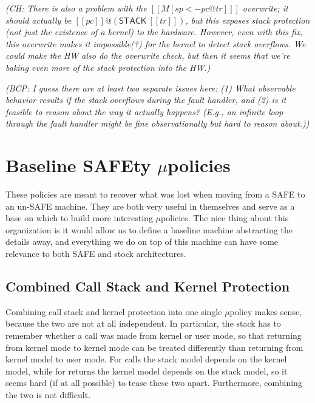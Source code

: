 \documentclass{article}
\newcommand{\bcp}[1]{{\color{blue}\em (BCP: #1)}}
\newcommand{\ch}[1]{{\color{dkblue}\em (CH: #1)}}
\newcommand{\micro}{$\mu$}
\newcommand{\uP}{\micro policy\xspace}
\newcommand{\uPs}{\micro policies\xspace}
\begin{document}
\ch{There is also a problem with the $[[M[sp <- pc@tr] ]]$ overwrite;
  it should actually be $[[pc]]@(\mathsf{STACK}~[[tr]])$, but this
  exposes stack protection (not just the existence of a kernel) to the
  hardware. However, even with this fix, this overwrite makes it
  impossible(?) for the kernel to detect stack overflows. We could
  make the HW also do the overwrite check, but then it seems that
  we're baking even more of the stack protection into the HW.}

\bcp{I guess there are at least two separate issues here: (1) What
  observable behavior results if the stack overflows during the fault
  handler, and (2) is it feasible to reason about the way it actually
  happens?  (E.g., an infinite loop through the fault handler might be fine
  observationally but hard to reason about.)}

\section{Baseline SAFEty \uPs}

These policies are meant to recover what was lost when moving from a
SAFE to an un-SAFE machine. They are both very useful in themselves
and serve as a base on which to build more interesting \uPs.
%
The nice thing about this organization is it would allow us to define
a baseline machine abstracting the details away, and everything we do
on top of this machine can have some relevance to both SAFE and stock
architectures.

\subsection{Combined Call Stack and Kernel Protection}

Combining call stack and kernel protection into one single \uP makes
sense, because the two are not at all independent. In particular, the
stack has to remember whether a call was made from kernel or user
mode, so that returning from kernel mode to kernel mode can be treated
differently than returning from kernel model to user mode. For calls
the stack model depends on the kernel model, while for returns the
kernel model depends on the stack model, so it seems hard (if at all
possible) to tease these two apart. Furthermore, combining the two is
not difficult.
\end{document}
